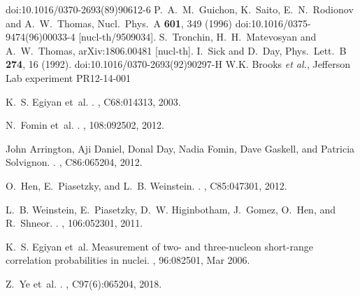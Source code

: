 \documentclass[twocolumn]{revtex4}
\begin{document}
\begin{thebibliography}{25}
  doi:10.1016/0370-2693(89)90612-6
%
  P.~A.~M.~Guichon, K.~Saito, E.~N.~Rodionov and A.~W.~Thomas,
  Nucl.\ Phys.\ A {\bf 601}, 349 (1996)
  doi:10.1016/0375-9474(96)00033-4
  [nucl-th/9509034].
%
  S.~Tronchin, H.~H.~Matevosyan and A.~W.~Thomas,
  arXiv:1806.00481 [nucl-th].
%
  I.~Sick and D.~Day,
  Phys.\ Lett.\ B {\bf 274}, 16 (1992).
  doi:10.1016/0370-2693(92)90297-H
%
W.K. Brooks {\it et al.}, Jefferson Lab experiment PR12-14-001
%


K.~S. Egiyan et~al.
.
, C68:014313, 2003.

N.~Fomin et~al.
.
, 108:092502, 2012.

John Arrington, Aji Daniel, Donal Day, Nadia Fomin, Dave Gaskell, and Patricia
  Solvignon.
.
, C86:065204, 2012.

O.~Hen, E.~Piasetzky, and L.~B. Weinstein.
.
, C85:047301, 2012.

L.~B. Weinstein, E.~Piasetzky, D.~W. Higinbotham, J.~Gomez, O.~Hen, and
  R.~Shneor.
.
, 106:052301, 2011.

K.~S. Egiyan et~al.
\newblock Measurement of two- and three-nucleon short-range correlation
  probabilities in nuclei.
, 96:082501, Mar 2006.

Z.~Ye et~al.
.
, C97(6):065204, 2018.


\end{thebibliography}
\end{document}

